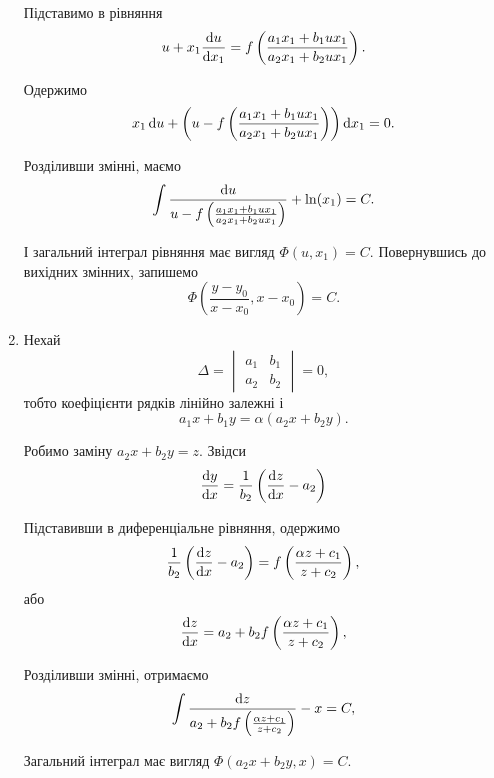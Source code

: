 \begin{enumerate}
	Підставимо в рівняння
	\begin{equation*}
		u + x_1 \frac{\mathop{}\!\mathrm{d} u}{\mathop{}\!\mathrm{d} x_1} = f \left( \frac{a_1 x_1 + b_1 u x_1}{a_2 x_1 + b_2 u x_1} \right).
	\end{equation*}
	
	Одержимо
	\begin{equation*}
		x_1 \mathop{}\!\mathrm{d} u + \left( u - f \left( \frac{a_1 x_1 + b_1 u x_1}{a_2 x_1 + b_2 u x_1} \right) \right) \mathop{}\!\mathrm{d} x_1 = 0.
	\end{equation*}

	Розділивши змінні, маємо
	\begin{equation*}
		\int \frac{\mathop{}\!\mathrm{d} u}{u - f \left( \frac{a_1 x_1 + b_1 u x_1}{a_2 x_1 + b_2 u x_1} \right)} + \ln (x_1) = C.
	\end{equation*}

	І загальний інтеграл рівняння має вигляд $\Phi(u, x_1) = C$. Повернувшись до вихідних змінних, запишемо
	\begin{equation*}
		\Phi \left( \frac{y - y_0}{x - x_0}, x - x_0 \right) = C.
	\end{equation*}

	\item Нехай 
	\begin{equation*}
		\Delta = 
		\begin{vmatrix} 
			a_1 & b_1 \\ 
			a_2 & b_2 
		\end{vmatrix} 
		= 0,
	\end{equation*}
	тобто коефіцієнти рядків лінійно залежні і
	\begin{equation*}
		a_1 x + b_1 y = \alpha (a_2 x + b_2 y).
	\end{equation*}

	Робимо заміну $a_2 x + b_2 y = z$. Звідси 
	\begin{equation*}
		\frac{\mathop{}\!\mathrm{d} y}{\mathop{}\!\mathrm{d} x} = \frac{1}{b_2} \left( \frac{\mathop{}\!\mathrm{d} z}{\mathop{}\!\mathrm{d} x} - a_2 \right)
	\end{equation*}

	Підставивши в диференціальне рівняння, одержимо
	\begin{equation*}
		\frac{1}{b_2} \left( \frac{\mathop{}\!\mathrm{d} z}{\mathop{}\!\mathrm{d} x} - a_2 \right) = f \left ( \frac{\alpha z + c_1}{z + c_2} \right),
	\end{equation*}
	або
	\begin{equation*}
		\frac{\mathop{}\!\mathrm{d} z}{\mathop{}\!\mathrm{d} x} = a_2 + b_2 f \left ( \frac{\alpha z + c_1}{z + c_2} \right),
	\end{equation*}

	Розділивши змінні, отримаємо
	\begin{equation*}
		\int \frac{\mathop{}\!\mathrm{d} z}{a_2 + b_2 f \left ( \frac{\alpha z + c_1}{z + c_2} \right)} - x = C,
	\end{equation*}

	Загальний інтеграл має вигляд $\Phi(a_2 x + b_2 y, x) = C$.
\end{enumerate}
